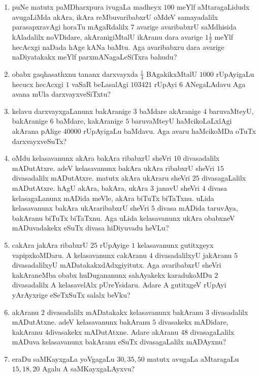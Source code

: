 \begin{enumerate}
\item puNe matutx  paMDharxpura ivugaLa madheyx $100$ meYlf
aMtaragaLidudx avugaLiMda akAra, ikAra reMbuvaribabxrU oMdeV
samayadalilx parasapxravAgi horaTu mAgaRdalilx $7$ avarige avaribabxrU
saMdhisida kAladalilx noVDidare, akAranigiMtalU ikAranu dara avarige
$1 \frac{1}{2}$ meYlf hecAcxgi naDada hAge kANa baMtu. Aga avaribabxru
dara avarige naDiyatakakx meYlf parxmANagaLeSiTxra bahudu?

\item obabx gaqhasathxnu tananx darxvayxda $\frac{1}{4}$ BAgakikxMtalU
$1000$ rUpAyigaLu hecucx hecAcxgi $1$ vaSaR beLasalAgi $103421$ rUpAyi
$6$ ANegaLAdavu Aga avana mUla darxvayxveSiTxtu?

\item kelavu darxvayxgaLanunx bakAranige $3$ baMdare akAranige $4$
baruvaMteyU, bakAranige $6$ baMdare, kakAranige $5$ baruvaMteyU
haMcikoLaLxlAgi akArana pAlige $40000$ rUpAyigaLu baMdavu. Aga avaru
haMcikoMDa oTuTx darxvayxveSuTx?

\item oMdu kelasavanunx akAra bakAra ribabxrU sheVri $10$ divasadalilx
mADutAtxre. adeV kelasavanunx bakAra ukAra ribabxrU sheVri $15$
divasadalilx mADutAtxre. matutx akAra ukAraru sheVri $25$
divasagaLalilx mADutAtxre. hAgU akAra, bakAra, ukAra $3$ janavU sheVri
$4$ divasa kelasagaLanunx mADida meVle, akAra biTuTx biTaTxnu. uLida
kelasavanunx bakAra ukAraribabxrU sheVri $5$ divasa mADida taruvAya,
bakAranu biTuTx biTaTxnu. Aga uLida kelasavanunx ukAra obabxneV
mADuvadakekx eSuTx divasa hiDiyuvadu heVLu?

\item cakAra jakAra ribabxrU $25$ rUpAyige $1$ kelasavanunx gutitxgeyx
vapipxkoMDaru. A kelasavanunx cakAranu $4$ divasadalilxyU jakAranu $5$
divasadalilxyU mADatakakxdAdxgiyitutx. Aga avaribabxrU sheVri
kakAraneMba \hbox{obabx} huDugananunx sahAyakekx karadukoMDu $2$ divasadalilx
A kelasavelAlx pUreYsidaru. Adare A gutitxgeV rUpAyi yArAyxrige
eSeTxSuTx salalx beVku?

\item akAranu $2$ divasadalilx mADatakakx kelasavanunx bakAranu $3$
divasadalilx mADutAtxne. adeV kelasavanunx bakAranu $5$ divasakekx
mADidare, kakAranu $4$divasakekx mADutAtxne. Adare akAranu $48$
divasagaLalilx mADuva kelasavanunx bakAranu eSuTx divasagaLalilx
mADAyxnu?

\item eraDu saMKayxgaLa yoVgagaLu $30, 35, 50$ matutx avugaLa
aMtaragaLu $15, 18, 20$ Agalu A saMKayxgaLAyxvu?


\end{enumerate}
